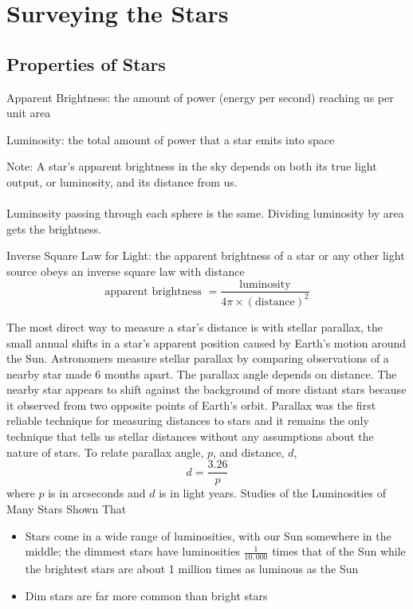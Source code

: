 \documentclass[12pt]{article}
\begin{document}
\section{Surveying the Stars} 
\subsection{Properties of Stars} 
\begin{definition} Apparent Brightness: the amount of power (energy per second) reaching us per unit area \end{definition}
\begin{definition} Luminosity: the total amount of power that a star emits into space \end{definition}
Note: A star's apparent brightness in the sky depends on both its true light output, or luminosity, and its distance from us. \\~\\
Luminosity passing through each sphere is the same. Dividing luminosity by area gets the brightness. 
\begin{definition} Inverse Square Law for Light: the apparent brightness of a star or any other light source obeys an inverse square law with distance $$\text{apparent brightness } = \frac{\text{luminosity}}{4\pi \times (\text{distance})^2} $$ \end{definition}
The most direct way to measure a star's distance is with stellar parallax, the small annual shifts in a star's apparent position caused by Earth's motion around the Sun. Astronomers measure stellar parallax by comparing observations of a nearby star made 6 months apart. The parallax angle depends on distance. The nearby star appears to shift against the background of more distant stars because it observed from two opposite points of Earth's orbit. Parallax was the first reliable technique for measuring distances to stars and it remains the only technique that tells us stellar distances without any assumptions about the nature of stars. To relate parallax angle, $p$, and distance, $d$, $$d = \frac{3.26}{p} $$ where $p$ is in arcseconds and $d$ is in light years.  \newpage
Studies of the Luminosities of Many Stars Shown That \begin{itemize} 
\item Stars come in a wide range of luminosities, with our Sun somewhere in the middle; the dimmest stars have luminosities $\frac{1}{10,000}$ times that of the Sun while the brightest stars are about 1 million times as luminous as the Sun 
\item Dim stars are far more common than bright stars \end{itemize} 
\end{document}

